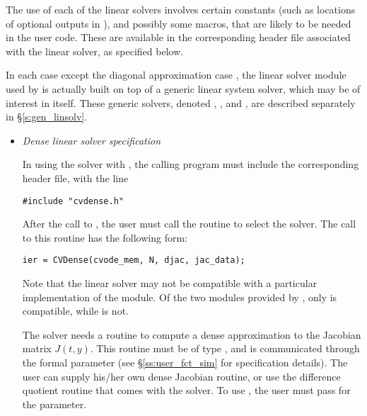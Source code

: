 The use of each of the linear solvers involves certain constants (such
as locations of optional outputs in ), and possibly some
macros, that are likely to be needed in the user code.  These are
available in the corresponding header file associated with the linear
solver, as specified below.

In each case except the diagonal approximation case {\cvdiag}, the linear
solver module used by {\cvode} is actually built on top of a generic
linear system solver, which may be of interest in itself.  These
generic solvers, denoted {\dense}, {\band}, and {\spgmr}, are described
separately in \S\ref{s:gen_linsolv}.
%
\begin{itemize}
%
%
\item {\em Dense linear solver specification} 

  In using the {\cvdense} solver with {\cvode}, the calling program must
  include the corresponding header file, with the line
\begin{verbatim}
#include "cvdense.h"
\end{verbatim}
  \par After the call to , the user must call the routine 
  to select the {\cvdense} solver. The call to this routine has the following form:
\begin{verbatim}
ier = CVDense(cvode_mem, N, djac, jac_data);
\end{verbatim}

  Note that the {\cvdense} linear solver may not be compatible with a particular
  implementation of the {\nvector} module. Of the two {\nvector} modules 
  provided by {\sundials}, only {\nvecs} is compatible, while {\nvecp} is not.

  The 
  {\cvdense} solver needs a routine to compute a dense approximation to
  the Jacobian matrix $J(t,y)$.  This routine must be of type
  , and is communicated through the  
  formal parameter  (see \S\ref{ss:user_fct_sim} for specification
  details).  The user can supply his/her own dense
  Jacobian routine, or use the difference quotient routine  
  that comes with the {\cvdense} solver.  To use , the user 
  must pass  for the  parameter.
  

\end{itemize}
